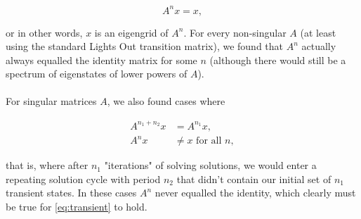 \documentclass[11pt]{article}
\begin{document}
\begin{equation}
A^nx = x,
\end{equation}

\noindent or in other words, $x$ is an eigengrid of $A^n$. For every non-singular $A$ (at least using the standard Lights Out transition matrix), we found that $A^n$ actually always equalled the identity matrix for some $n$ (although there would still be a spectrum of eigenstates of lower powers of $A$).

\paragraph{} For singular matrices $A$, we also found cases where

\begin{equation}
\begin{split}
  A^{n_1 + n_2}x & = A^{n_1}x,\\
  A^{n}x & \neq x \text{ for all } n,
\end{split}
\label{eq:transient}
\end{equation}

\noindent that is, where after $n_1$ "iterations" of solving solutions, we would enter a repeating solution cycle with period $n_2$ that didn't contain our initial set of $n_1$ transient states. In these cases $A^n$ never equalled the identity, which clearly must be true for \eqref{eq:transient} to hold.
\end{document}
